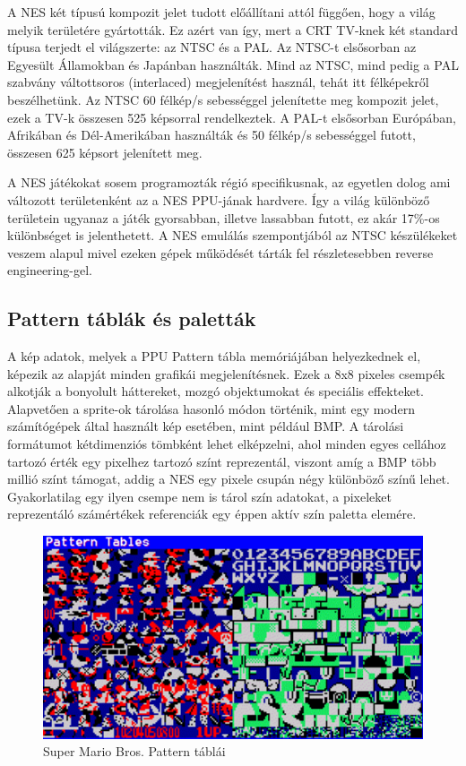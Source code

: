	A NES két típusú kompozit jelet tudott előállítani attól függően, hogy a világ melyik területére gyártották. Ez azért van így, mert a CRT TV-knek két standard típusa terjedt el világszerte: az NTSC és a PAL. Az NTSC-t elsősorban az Egyesült Államokban és Japánban használták. Mind az NTSC, mind pedig a PAL szabvány váltottsoros (interlaced) megjelenítést használ, tehát itt félképekről beszélhetünk. Az NTSC 60 félkép/s sebességgel jelenítette meg kompozit jelet, ezek a TV-k összesen 525 képsorral rendelkeztek. A PAL-t elsősorban Európában, Afrikában és Dél-Amerikában használták és 50 félkép/s sebességgel futott, összesen 625 képsort jelenített meg.
	
	A NES játékokat sosem programozták régió specifikusnak, az egyetlen dolog ami változott területenként az a NES PPU-jának hardvere. Így a világ különböző területein ugyanaz a játék gyorsabban, illetve lassabban futott, ez akár 17\%-os különbséget is jelenthetett. A NES emulálás szempontjából az NTSC készülékeket veszem alapul mivel ezeken gépek működését tárták fel részletesebben reverse engineering-gel.
	
	\subsection{Pattern táblák és paletták}
	\label{sec:Pattern-tables-and-palettes}
	A kép adatok, melyek a PPU Pattern tábla memóriájában helyezkednek el, képezik az alapját minden grafikái megjelenítésnek. Ezek a  8x8 pixeles csempék alkotják a bonyolult háttereket, mozgó objektumokat és speciális effekteket. Alapvetően a sprite-ok tárolása hasonló módon történik, mint egy modern számítógépek által használt kép esetében, mint például BMP. A tárolási formátumot kétdimenziós tömbként lehet elképzelni, ahol minden egyes cellához tartozó érték egy pixelhez tartozó színt reprezentál, viszont amíg a BMP több millió színt támogat, addig a NES egy pixele csupán négy különböző színű lehet. Gyakorlatilag egy ilyen csempe nem is tárol szín adatokat, a pixeleket reprezentáló számértékek referenciák egy éppen aktív szín paletta elemére.
	
	\begin{figure}[H]
		\centering
		\includegraphics[width=150mm, keepaspectratio]{figures/Mario-Patterns}
		\caption{Super Mario Bros. Pattern táblái \cite{Super_Mario_Bros_pattern}}
		\label{fig:Mario-Pattern}
	\end{figure}
	
